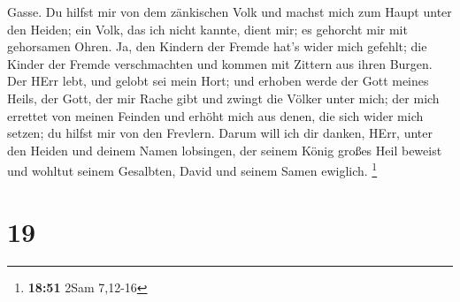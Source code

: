 Gasse.  Du hilfst mir von dem zänkischen Volk und machst
mich zum Haupt unter den Heiden; ein Volk, das ich nicht kannte, dient
mir;  es gehorcht mir mit gehorsamen Ohren. Ja, den Kindern
der Fremde hat's wider mich gefehlt;  die Kinder der Fremde
verschmachten und kommen mit Zittern aus ihren Burgen.  Der
HErr lebt, und gelobt sei mein Hort; und erhoben werde der Gott meines
Heils,  der Gott, der mir Rache gibt und zwingt die Völker
unter mich;  der mich errettet von meinen Feinden und
erhöht mich aus denen, die sich wider mich setzen; du hilfst mir von den
Frevlern.  Darum will ich dir danken, HErr, unter den
Heiden und deinem Namen lobsingen,  der seinem König großes
Heil beweist und wohltut seinem Gesalbten, David und seinem Samen
ewiglich. \footnote{\textbf{18:51} 2Sam 7,12-16}

\hypertarget{section-8}{%
\section{19}\label{section-8}}

